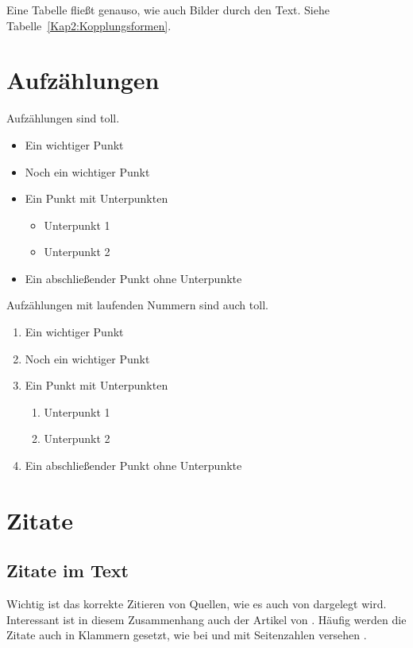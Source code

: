 Eine Tabelle fließt genauso, wie auch Bilder durch den Text. Siehe Tabelle~\ref{Kap2:Kopplungsformen}.


\section{Aufzählungen}

Aufzählungen sind toll.

\begin{itemize}
  \item Ein wichtiger Punkt
  \item Noch ein wichtiger Punkt
  \item Ein Punkt mit Unterpunkten
    \begin{itemize}
      \item Unterpunkt 1
      \item Unterpunkt 2
    \end{itemize}
  \item Ein abschließender Punkt ohne Unterpunkte
\end{itemize}


Aufzählungen mit laufenden Nummern sind auch toll.

\begin{enumerate}
  \item Ein wichtiger Punkt
  \item Noch ein wichtiger Punkt
  \item Ein Punkt mit Unterpunkten
    \begin{enumerate}
      \item Unterpunkt 1
      \item Unterpunkt 2
    \end{enumerate}
  \item Ein abschließender Punkt ohne Unterpunkte
\end{enumerate}


\section{Zitate}

\subsection{Zitate im Text}

Wichtig ist das korrekte Zitieren von Quellen, wie es auch von \cite{Kornmeier2011} dargelegt wird. Interessant ist in diesem Zusammenhang auch der Artikel von \cite{Kramer2009}. Häufig werden die Zitate auch in Klammern gesetzt, wie bei \parencite{Kornmeier2011} und mit Seitenzahlen versehen \parencite[S. 22--24]{Kornmeier2011}.

